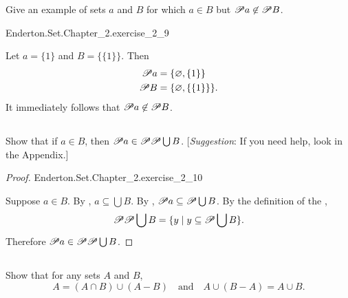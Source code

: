 \documentclass{report}
\begin{document}
Give an example of sets $a$ and $B$ for which $a \in B$ but
  $\mathscr{P}a \not\in \mathscr{P}B$.

\begin{answer}

    {Enderton.Set.Chapter\_2.exercise\_2\_9}

  Let $a = \{1\}$ and $B = \{\{1\}\}$.
  Then
    \begin{align*}
      \mathscr{P}a & = \{\varnothing, \{1\}\} \\
      \mathscr{P}B & = \{\varnothing, \{\{1\}\}\}.
    \end{align*}
  It immediately follows that $\mathscr{P}a \not\in \mathscr{P}B$.

\end{answer}

\subsection{}%
\label{sub:exercise-2.10}

Show that if $a \in B$, then $\mathscr{P}a \in \mathscr{P}\mathscr{P}\bigcup B$.
[\textit{Suggestion}: If you need help, look in the Appendix.]

\begin{proof}

    {Enderton.Set.Chapter\_2.exercise\_2\_10}

  Suppose $a \in B$.
  By , $a \subseteq \bigcup B$.
  By , $\mathscr{P}a \subseteq \mathscr{P}\bigcup B$.
  By the definition of the ,
    $$\mathscr{P}\mathscr{P}\bigcup B =
      \{ y \mid y \subseteq \mathscr{P}\bigcup B \}.$$
  Therefore $\mathscr{P}a \in \mathscr{P}\mathscr{P}\bigcup B$.

\end{proof}

\subsection{}%
\label{sub:exercise-2.11}

Show that for any sets $A$ and $B$,
  $$A = (A \cap B) \cup (A - B) \quad\text{and}\quad
    A \cup (B - A) = A \cup B.$$
\end{document}
